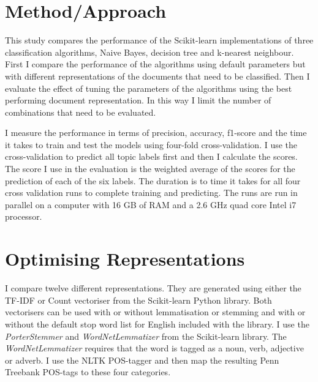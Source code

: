 \documentclass[11pt]{article}
\begin{document}
\section{Method/Approach}

This study compares the performance of the Scikit-learn implementations of three classification algorithms, Naive Bayes, decision tree and k-nearest neighbour. First I compare the performance of the algorithms using default parameters but with different representations of the documents that need to be classified. Then I evaluate the effect of tuning the parameters of the algorithms using the best performing document representation. In this way I limit the number of combinations that need to be evaluated.

I measure the performance in terms of precision, accuracy, f1-score and the time it takes to train and test the models using four-fold cross-validation. I use the cross-validation to predict all topic labels first and then I calculate the scores. The score I use in the evaluation is the weighted average of the scores for the prediction of each of the six labels. The duration is to time it takes for all four cross validation runs to complete training and predicting. The runs are run in parallel on a computer with 16 GB of RAM and a 2.6 GHz quad core Intel i7 processor.

\section{Optimising Representations}

I compare twelve different representations. They are generated using either the TF-IDF or Count vectoriser from the Scikit-learn Python library. Both vectorisers can be used with or without lemmatisation or stemming and with or without the default stop word list for English included with the library. I use the \emph{PorterStemmer} and \emph{WordNetLemmatizer} from the Scikit-learn library. The \emph{WordNetLemmatizer} requires that the word is tagged as a noun, verb, adjective or adverb. I use the NLTK POS-tagger and then map the resulting Penn Treebank POS-tags to these four categories.
\end{document}
